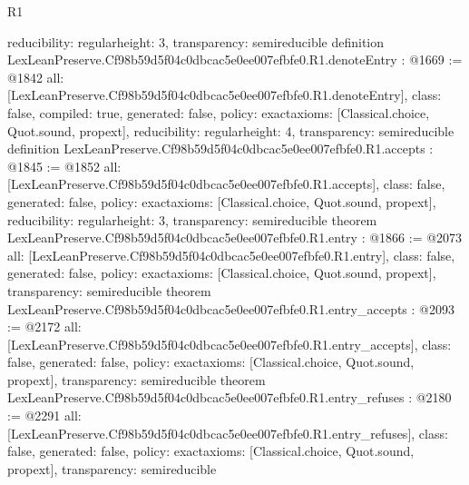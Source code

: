 \begin{lexlean}{R1}
\begin{coremodule}
{  reducibility: regular{height: 3},
  transparency: semireducible
}
definition LexLeanPreserve.Cf98b59d5f04c0dbcac5e0ee007efbfe0.R1.denoteEntry : @1669 := @1842 {
  all: [LexLeanPreserve.Cf98b59d5f04c0dbcac5e0ee007efbfe0.R1.denoteEntry],
  class: false,
  compiled: true,
  generated: false,
  policy: exact{axioms: [Classical.choice, Quot.sound, propext]},
  reducibility: regular{height: 4},
  transparency: semireducible
}
definition LexLeanPreserve.Cf98b59d5f04c0dbcac5e0ee007efbfe0.R1.accepts : @1845 := @1852 {
  all: [LexLeanPreserve.Cf98b59d5f04c0dbcac5e0ee007efbfe0.R1.accepts],
  class: false,
  generated: false,
  policy: exact{axioms: [Classical.choice, Quot.sound, propext]},
  reducibility: regular{height: 3},
  transparency: semireducible
}
theorem LexLeanPreserve.Cf98b59d5f04c0dbcac5e0ee007efbfe0.R1.entry : @1866 := @2073 {
  all: [LexLeanPreserve.Cf98b59d5f04c0dbcac5e0ee007efbfe0.R1.entry],
  class: false,
  generated: false,
  policy: exact{axioms: [Classical.choice, Quot.sound, propext]},
  transparency: semireducible
}
theorem LexLeanPreserve.Cf98b59d5f04c0dbcac5e0ee007efbfe0.R1.entry_accepts : @2093 := @2172 {
  all: [LexLeanPreserve.Cf98b59d5f04c0dbcac5e0ee007efbfe0.R1.entry_accepts],
  class: false,
  generated: false,
  policy: exact{axioms: [Classical.choice, Quot.sound, propext]},
  transparency: semireducible
}
theorem LexLeanPreserve.Cf98b59d5f04c0dbcac5e0ee007efbfe0.R1.entry_refuses : @2180 := @2291 {
  all: [LexLeanPreserve.Cf98b59d5f04c0dbcac5e0ee007efbfe0.R1.entry_refuses],
  class: false,
  generated: false,
  policy: exact{axioms: [Classical.choice, Quot.sound, propext]},
  transparency: semireducible
}


\end{coremodule}
\end{lexlean}
